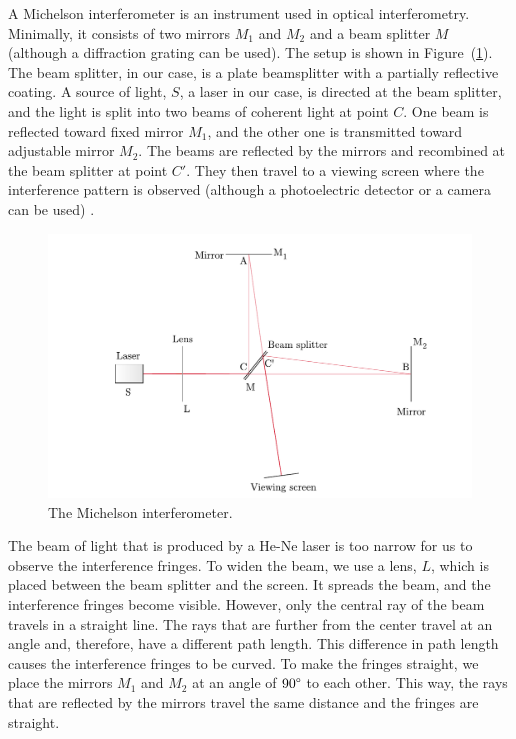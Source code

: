 \documentclass[10pt]{article}
\begin{document}
A Michelson interferometer is an instrument used in optical interferometry. Minimally, it consists of two mirrors $M_1$ and $M_2$ and a beam splitter $M$ (although a diffraction grating can be used). The setup is shown in Figure~(\ref{fig:1}). The beam splitter, in our case, is a plate beamsplitter with a partially reflective coating. A source of light, $S$, a laser in our case, is directed at the beam splitter, and the light is split into two beams of coherent light at point $C$. One beam is reflected toward fixed mirror $M_1$, and the other one is transmitted toward adjustable mirror $M_2$. The beams are reflected by the mirrors and recombined at the beam splitter at point $C'$. They then travel to a viewing screen where the interference pattern is observed (although a photoelectric detector or a camera can be used) \cite{Hecht_2017}.

\begin{figure}[hbt!]
  \centering
  \includegraphics[scale=0.6]{figures/f1.pdf}
  \caption{The Michelson interferometer.}
  \label{fig:1}
\end{figure}

The beam of light that is produced by a He-Ne laser is too narrow for us to observe the interference fringes. To widen the beam, we use a lens, $L$, which is placed between the beam splitter and the screen. It spreads the beam, and the interference fringes become visible. However, only the central ray of the beam travels in a straight line. The rays that are further from the center travel at an angle and, therefore, have a different path length. This difference in path length causes the interference fringes to be curved. To make the fringes straight, we place the mirrors $M_1$ and $M_2$ at an angle of $90\degree$ to each other. This way, the rays that are reflected by the mirrors travel the same distance and the fringes are straight. 
\end{document}
